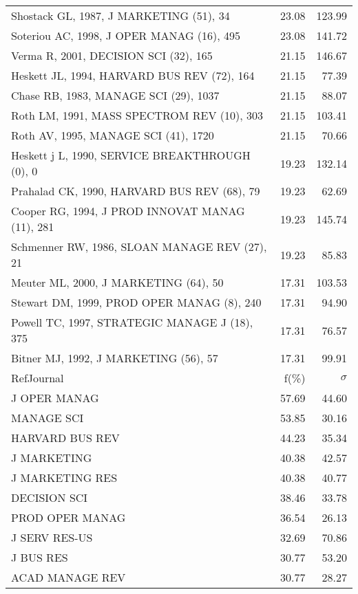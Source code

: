 \documentclass[a4paper,11pt]{report}
\begin{document}
\begin{landscape}
\begin{table}[!ht]
{\begin{tabular}{|l r r|}
Shostack GL, 1987, J MARKETING (51), 34 & 23.08 & 123.99\\
Soteriou AC, 1998, J OPER MANAG (16), 495 & 23.08 & 141.72\\
Verma R, 2001, DECISION SCI (32), 165 & 21.15 & 146.67\\
Heskett JL, 1994, HARVARD BUS REV (72), 164 & 21.15 & 77.39\\
Chase RB, 1983, MANAGE SCI (29), 1037 & 21.15 & 88.07\\
Roth LM, 1991, MASS SPECTROM REV (10), 303 & 21.15 & 103.41\\
Roth AV, 1995, MANAGE SCI (41), 1720 & 21.15 & 70.66\\
Heskett j L, 1990, SERVICE BREAKTHROUGH (0), 0 & 19.23 & 132.14\\
Prahalad CK, 1990, HARVARD BUS REV (68), 79 & 19.23 & 62.69\\
Cooper RG, 1994, J PROD INNOVAT MANAG (11), 281 & 19.23 & 145.74\\
Schmenner RW, 1986, SLOAN MANAGE REV (27), 21 & 19.23 & 85.83\\
Meuter ML, 2000, J MARKETING (64), 50 & 17.31 & 103.53\\
Stewart DM, 1999, PROD OPER MANAG (8), 240 & 17.31 & 94.90\\
Powell TC, 1997, STRATEGIC MANAGE J (18), 375 & 17.31 & 76.57\\
Bitner MJ, 1992, J MARKETING (56), 57 & 17.31 & 99.91\\
\hline
\hline
RefJournal & f(\%) & $\sigma$\\
\hline
J OPER MANAG & 57.69 & 44.60\\
MANAGE SCI & 53.85 & 30.16\\
HARVARD BUS REV & 44.23 & 35.34\\
J MARKETING & 40.38 & 42.57\\
J MARKETING RES & 40.38 & 40.77\\
DECISION SCI & 38.46 & 33.78\\
PROD OPER MANAG & 36.54 & 26.13\\
J SERV RES-US & 32.69 & 70.86\\
J BUS RES & 30.77 & 53.20\\
ACAD MANAGE REV & 30.77 & 28.27\\
\hline
\end{tabular}
}
\end{table}

\clearpage


\end{landscape}
\end{document}
